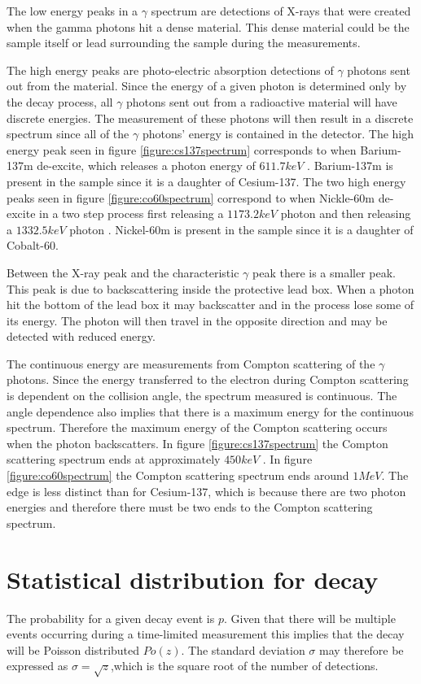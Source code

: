 \documentclass[12pt]{report}
\begin{document}
The low energy peaks in a $\gamma$ spectrum are detections of X-rays that were created when the gamma photons hit a dense material. This dense material could be the sample itself or lead surrounding the sample during the measurements.

The high energy peaks are photo-electric absorption detections of $\gamma$ photons sent out from the material. Since the energy of a given photon is determined only by the decay process, all $\gamma$ photons sent out from a radioactive material will have discrete energies. The measurement of these photons will then result in a discrete spectrum since all of the $\gamma$ photons’ energy is contained in the detector. The high energy peak seen in figure \ref{figure:cs137spectrum} corresponds to when Barium-137m de-excite, which releases a photon energy of $611.7keV$ \cite{nudatCs}. Barium-137m is present in the sample since it is a daughter of Cesium-137. The two high energy peaks seen in figure \ref{figure:co60spectrum} correspond to when Nickle-60m de-excite in a two step process first releasing a $1173.2keV$ photon and then releasing a $1332.5keV$ photon \cite{nudatCo}. Nickel-60m is present in the sample since it is a daughter of Cobalt-60.

Between the X-ray peak and the characteristic $\gamma$ peak there is a smaller peak. This peak is due to backscattering inside the protective lead box. When a photon hit the bottom of the lead box it may backscatter and in the process lose some of its energy. The photon will then travel in the opposite direction and may be detected with reduced energy.

\pagebreak
The continuous energy are measurements from Compton scattering of the $\gamma$ photons. Since the energy transferred to the electron during Compton scattering is dependent on the collision angle, the spectrum measured is continuous. The angle dependence also implies that there is a maximum energy for the continuous spectrum. Therefore the maximum energy of the Compton scattering occurs when the photon backscatters. In figure \ref{figure:cs137spectrum} the Compton scattering spectrum ends at approximately $450keV$ . In figure \ref{figure:co60spectrum} the Compton scattering spectrum ends around $1 MeV$. The edge is less distinct than for Cesium-137, which is because there are two photon energies and therefore there must
be two ends to the Compton scattering spectrum.

\section{Statistical distribution for decay}
The probability for a given decay event is $p$. Given that there will be multiple events occurring during a time-limited measurement this implies that the decay will be Poisson distributed $Po(z)$. The standard deviation $\sigma$ may therefore be expressed as $\sigma = \sqrt{z}$,which is the square root of the number of detections.
\end{document}
